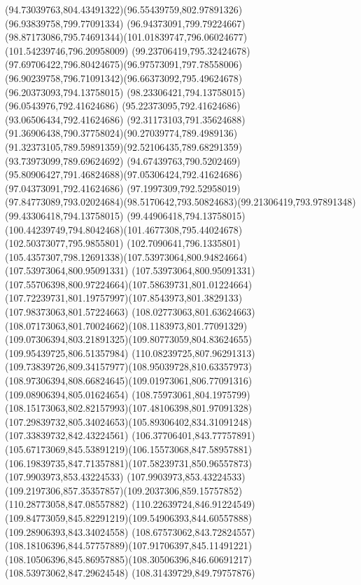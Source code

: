 {{	\curveto(94.73039763,804.43491322)(96.55439759,802.97891326)(96.93839758,799.77091334)
	\lineto(96.94373091,799.79224667)
	\curveto(98.87173086,795.74691344)(101.01839747,796.06024677)(101.54239746,796.20958009)
	\curveto(99.23706419,795.32424678)(97.69706422,796.80424675)(96.97573091,797.78558006)
	\curveto(96.90239758,796.71091342)(96.66373092,795.49624678)(96.20373093,794.13758015)
	\lineto(98.23306421,794.13758015)
	\lineto(96.0543976,792.41624686)
	\lineto(95.22373095,792.41624686)
	\lineto(93.06506434,792.41624686)
	\curveto(92.31173103,791.35624688)(91.36906438,790.37758024)(90.27039774,789.4989136)
	\curveto(91.32373105,789.59891359)(92.52106435,789.68291359)(93.73973099,789.69624692)
	\curveto(94.67439763,790.5202469)(95.80906427,791.46824688)(97.05306424,792.41624686)
	\lineto(97.04373091,792.41624686)
	\lineto(97.1997309,792.52958019)
	\curveto(97.84773089,793.02024684)(98.5170642,793.50824683)(99.21306419,793.97891348)
	\lineto(99.43306418,794.13758015)
	\lineto(99.44906418,794.13758015)
	\curveto(100.44239749,794.8042468)(101.4677308,795.44024678)(102.50373077,795.9855801)
	\curveto(102.7090641,796.1335801)(105.4357307,798.12691338)(107.53973064,800.94824664)
	\lineto(107.53973064,800.95091331)
	\curveto(107.53973064,800.95091331)(107.55706398,800.97224664)(107.58639731,801.01224664)
	\curveto(107.72239731,801.19757997)(107.8543973,801.3829133)(107.98373063,801.57224663)
	\curveto(108.02773063,801.63624663)(108.07173063,801.70024662)(108.1183973,801.77091329)
	\curveto(109.07306394,803.21891325)(109.80773059,804.83624655)(109.95439725,806.51357984)
	\curveto(110.08239725,807.96291313)(109.73839726,809.34157977)(108.95039728,810.63357973)
	\curveto(108.97306394,808.66824645)(109.01973061,806.77091316)(109.08906394,805.01624654)
	\curveto(108.75973061,804.1975799)(108.15173063,802.82157993)(107.48106398,801.97091328)
	\curveto(107.29839732,805.34024653)(105.89306402,834.31091248)(107.33839732,842.43224561)
	\curveto(106.37706401,843.77757891)(105.67173069,845.53891219)(106.15573068,847.58957881)
	\curveto(106.19839735,847.71357881)(107.58239731,850.96557873)(107.9903973,853.43224533)
	\curveto(107.9903973,853.43224533)(109.2197306,857.35357857)(109.2037306,859.15757852)
	\lineto(110.28773058,847.08557882)
	\lineto(110.22639724,846.91224549)
	\curveto(109.84773059,845.82291219)(109.54906393,844.60557888)(109.28906393,843.34024558)
	\curveto(108.67573062,843.72824557)(108.18106396,844.57757889)(107.91706397,845.11491221)
	\curveto(108.10506396,845.86957885)(108.30506396,846.60691217)(108.53973062,847.29624548)
	\lineto(108.31439729,849.79757876)
}}
